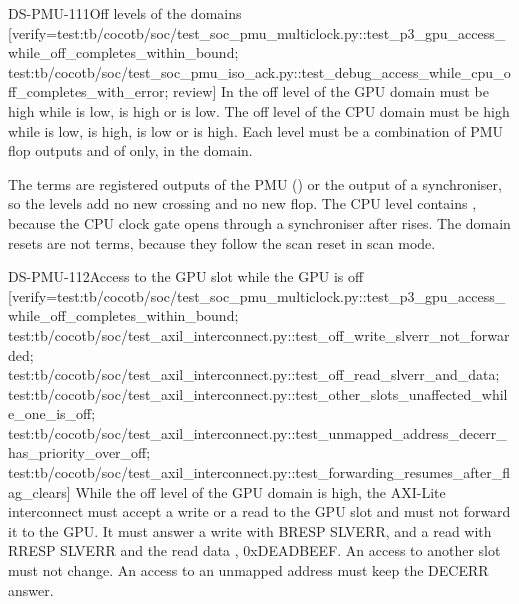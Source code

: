 \begin{requirement}{DS-PMU-111}{Off levels of the domains}
[verify={test:tb/cocotb/soc/test_soc_pmu_multiclock.py::test_p3_gpu_access_while_off_completes_within_bound; test:tb/cocotb/soc/test_soc_pmu_iso_ack.py::test_debug_access_while_cpu_off_completes_with_error; review}]
In  the off level of the GPU domain must be high while  is low,  is high or  is low. The off level of the CPU domain must be high while  is low,  is high,  is low or  is high. Each level must be a combination of PMU flop outputs and of  only, in the  domain.
\end{requirement}
\begin{rationale}
The terms are registered outputs of the PMU () or the output of a synchroniser, so the levels add no new crossing and no new flop. The CPU level contains , because the CPU clock gate opens through a synchroniser after  rises. The domain resets are not terms, because they follow the scan reset in scan mode.
\end{rationale}

\begin{requirement}{DS-PMU-112}{Access to the GPU slot while the GPU is off}
[verify={test:tb/cocotb/soc/test_soc_pmu_multiclock.py::test_p3_gpu_access_while_off_completes_within_bound; test:tb/cocotb/soc/test_axil_interconnect.py::test_off_write_slverr_not_forwarded; test:tb/cocotb/soc/test_axil_interconnect.py::test_off_read_slverr_and_data; test:tb/cocotb/soc/test_axil_interconnect.py::test_other_slots_unaffected_while_one_is_off; test:tb/cocotb/soc/test_axil_interconnect.py::test_unmapped_address_decerr_has_priority_over_off; test:tb/cocotb/soc/test_axil_interconnect.py::test_forwarding_resumes_after_flag_clears}]
While the off level of the GPU domain is high, the AXI-Lite interconnect must accept a write or a read to the GPU slot and must not forward it to the GPU. It must answer a write with BRESP SLVERR, and a read with RRESP SLVERR and the read data , 0xDEADBEEF. An access to another slot must not change. An access to an unmapped address must keep the DECERR answer.
\end{requirement}


